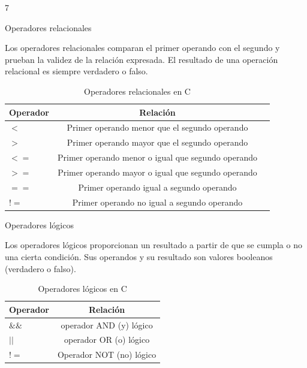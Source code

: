 7\documentclass[xcolor=pdftex,table,11pt]{beamer}
\begin{document}
\begin{frame}{Operadores relacionales}
\begin{block}{}
Los operadores relacionales comparan el primer operando con el segundo y prueban la validez de la relación expresada. El resultado de una operación relacional es siempre verdadero o falso.
\end{block}



\begin{table}
\begin{tabular}{l | c | l }
Operador & Relación \\
\hline \hline
$<$ & Primer operando menor que el segundo operando \\ 
$>$ & 	Primer operando mayor que el segundo operando\\ 
$<=$ & 	Primer operando menor o igual que segundo operando \\ 
$>=$ & Primer operando mayor o igual que segundo operando \\ 
$==$ & Primer operando igual a segundo operando \\ 
$!=$ & Primer operando no igual a segundo operando\\ 
\end{tabular}
\caption{Operadores relacionales en C}
\end{table}


\end{frame}


\begin{frame}{Operadores lógicos}
\begin{block}{}
Los operadores lógicos proporcionan un resultado a partir de que se cumpla o no una cierta condición. Sus operandos y su resultado son valores booleanos (verdadero o falso).
\end{block}



\begin{table}
\begin{tabular}{l | c}
Operador & Relación \\
\hline \hline
$\&\&$ &  operador AND (y) lógico \\ 
$||$ & 	operador OR  (o) lógico\\ 
$!=$ & 	Operador NOT (no) lógico \\ 
\end{tabular}
\caption{Operadores lógicos en C}
\end{table}

\end{frame}
\end{document}
